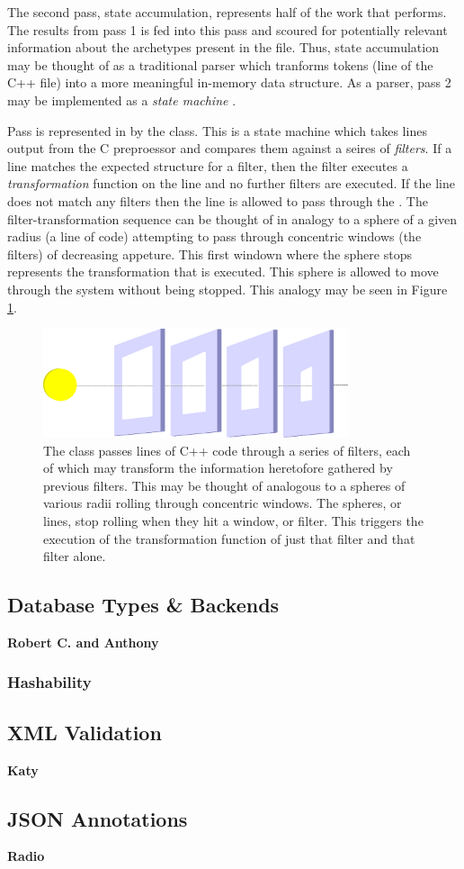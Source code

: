 The second pass, state accumulation, represents half of the work that \cycpp performs.
The results from pass 1 is fed into this pass and scoured for 
potentially relevant information about the archetypes present in the file. 
Thus, state accumulation 
may be thought of as a traditional parser which tranforms tokens (line of the 
C++ file) into a more meaningful in-memory data structure. As a parser, pass 2 
may be implemented as a \emph{state machine} \cite{mertz2003text,wagner2006modeling}.

Pass is represented in \cycpp by the  class.  This is a
state machine which takes lines output from the C preproessor and compares them 
against a seires of \emph{filters}.  If a line matches the expected structure 
for a filter, then the filter executes a \emph{transformation} function on the 
line and no further filters are executed. If the line does not match any filters
then the line is allowed to pass through the . 
The filter-transformation sequence can be thought of in analogy to a sphere of a 
given radius (a line of code) attempting to pass through concentric windows 
(the filters) of decreasing appeture. This first windown where the sphere stops 
represents the transformation that is executed.  This sphere is allowed to 
move through the system without being stopped. This analogy may be seen in 
Figure \ref{filter-analogy}.

\begin{figure}[htbc]
\label{filter-analogy}
\centering
\includegraphics[width=0.8\textwidth]{filter-analogy.eps}
\caption{The  class passes lines of C++ code through 
a series of filters, each of which may transform the information heretofore gathered
by previous filters. 
This may be thought of analogous to a spheres of various radii rolling through 
concentric windows.  The spheres, or lines, stop rolling when they hit a  
window, or filter. This triggers the execution of the transformation function of just 
that filter and that filter alone.}
\end{figure}


\subsection{Database Types \& Backends}

\textbf{Robert C. and Anthony}

\subsubsection{Hashability}

\subsection{XML Validation}

\textbf{Katy}

\subsection{JSON Annotations}

\textbf{Radio}
